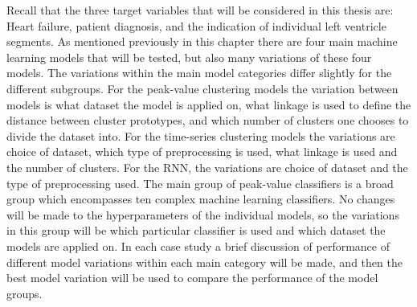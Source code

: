 Recall that the three target variables that will be considered in this thesis are: Heart failure, patient diagnosis, and the indication of individual left ventricle segments.
As mentioned previously in this chapter there are four main machine learning models that will be tested, but also many variations of these four models.
The variations within the main model categories differ slightly for the different subgroups. 
For the peak-value clustering models the variation between models is what dataset the model is applied on, what linkage is used to define the distance between cluster prototypes, and which number of clusters one chooses to divide the dataset into. 
For the time-series clustering models the variations are choice of dataset, which type of preprocessing is used, what linkage is used and the number of clusters.
For the RNN, the variations are choice of dataset and the type of preprocessing used. 
The main group of peak-value classifiers is a broad group which encompasses ten complex machine learning classifiers. 
No changes will be made to the hyperparameters of the individual models, so the variations in this group will be which particular classifier is used and which dataset the models are applied on. 
In each case study a brief discussion of performance of different model variations within each main category will be made, 
and then the best model variation will be used to compare the performance of the model groups.

